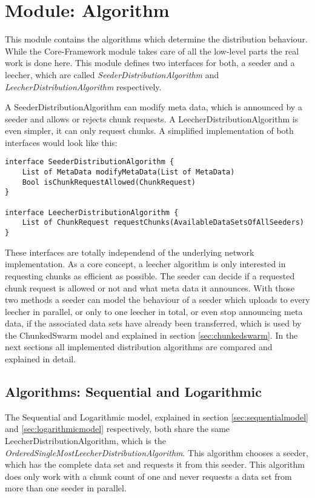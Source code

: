 \cleardoublepage
\chapter{Module: Algorithm}
\label{ch:algorithm}
This module contains the algorithms which determine the distribution behaviour. While the Core-Framework module takes care of all the low-level parts the real work is done here. This module defines two interfaces for both, a seeder and a leecher, which are called \emph{SeederDistributionAlgorithm} and \emph{LeecherDistributionAlgorithm} respectively. 

A SeederDistributionAlgorithm can modify meta data, which is announced by a seeder and allows or rejects chunk requests. A LeecherDistributionAlgorithm is even simpler, it can only request chunks. A simplified implementation of both interfaces would look like this:

\begin{verbatim}
interface SeederDistributionAlgorithm {
    List of MetaData modifyMetaData(List of MetaData)
    Bool isChunkRequestAllowed(ChunkRequest)
}

interface LeecherDistributionAlgorithm {
    List of ChunkRequest requestChunks(AvailableDataSetsOfAllSeeders)
}
\end{verbatim}

These interfaces are totally independend of the underlying network implementation. As a core concept, a leecher algorithm is only interested in requesting chunks as efficient as possible. The seeder can decide if a requested chunk request is allowed or not and what meta data it announces. With those two methods a seeder can model the behaviour of a seeder which uploads to every leecher in parallel, or only to one leecher in total, or even stop announcing meta data, if the associated data sets have already been transferred, which is used by the ChunkedSwarm model and explained in section \ref{sec:chunkedswarm}. In the next sections all implemented distribution algorithms are compared and explained in detail.

\section{Algorithms: Sequential and Logarithmic}
\label{sec:seqlog}
The Sequential and Logarithmic model, explained in section \ref{sec:sequentialmodel} and \ref{sec:logarithmicmodel} respectively, both share the same LeecherDistributionAlgorithm, which is the \emph{OrderedSingleMostLeecherDistributionAlgorithm}. This algorithm chooses a seeder, which has the complete data set and requests it from this seeder. This algorithm does only work with a chunk count of one and never requests a data set from more than one seeder in parallel.

